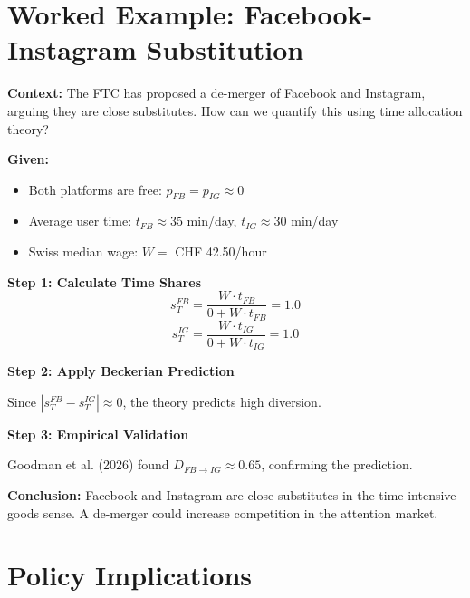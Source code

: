 
\section{Worked Example: Facebook-Instagram Substitution}
\label{sec:pt-platform-application}

\begin{tcolorbox}[colback=blue!5!white, colframe=blue!75!black,
    title=Case Study: CAS-853]

\textbf{Context:} The FTC has proposed a de-merger of Facebook and Instagram, arguing they are close substitutes. How can we quantify this using time allocation theory?

\textbf{Given:}
\begin{itemize}[nosep]
\item Both platforms are free: $p_{FB} = p_{IG} \approx 0$
\item Average user time: $t_{FB} \approx 35$ min/day, $t_{IG} \approx 30$ min/day
\item Swiss median wage: $W = $ CHF 42.50/hour
\end{itemize}

\textbf{Step 1: Calculate Time Shares}
\[
s_T^{FB} = \frac{W \cdot t_{FB}}{0 + W \cdot t_{FB}} = 1.0
\]
\[
s_T^{IG} = \frac{W \cdot t_{IG}}{0 + W \cdot t_{IG}} = 1.0
\]

\textbf{Step 2: Apply Beckerian Prediction}

Since $|s_T^{FB} - s_T^{IG}| \approx 0$, the theory predicts high diversion.

\textbf{Step 3: Empirical Validation}

Goodman et al. (2026) found $D_{FB \to IG} \approx 0.65$, confirming the prediction.

\textbf{Conclusion:} Facebook and Instagram are close substitutes in the time-intensive goods sense. A de-merger could increase competition in the attention market.

\end{tcolorbox}

\section{Policy Implications}
\label{sec:pt-policy}

